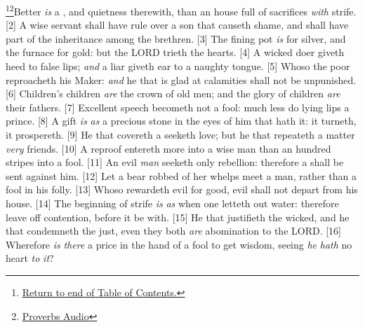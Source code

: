 \footnote{\textcolor[cmyk]{0.99998,1,0,0}{\hyperlink{TOC}{Return to end of Table of Contents.}}}\footnote{\href{https://www.audioverse.org/english/audiobibles/books/ENGKJV/O/Prov/1}{\textcolor[cmyk]{0.99998,1,0,0}{Proverbs Audio}}}\textcolor[cmyk]{0.99998,1,0,0}{Better \emph{is} a , and quietness therewith, than an house full of sacrifices \emph{with} strife.}
[2] \textcolor[cmyk]{0.99998,1,0,0}{A wise servant shall have rule over a son that causeth shame, and shall have part of the inheritance among the brethren.}
[3] \textcolor[cmyk]{0.99998,1,0,0}{The fining pot \emph{is} for silver, and the furnace for gold: but the LORD trieth the hearts.}
[4] \textcolor[cmyk]{0.99998,1,0,0}{A wicked doer giveth heed to false lips; \emph{and} a liar giveth ear to a naughty tongue.}
[5] \textcolor[cmyk]{0.99998,1,0,0}{Whoso  the poor reproacheth his Maker: \emph{and} he that is glad at calamities shall not be unpunished.}
[6] \textcolor[cmyk]{0.99998,1,0,0}{Children's children \emph{are} the crown of old men; and the glory of children \emph{are} their fathers.}
[7] \textcolor[cmyk]{0.99998,1,0,0}{Excellent speech becometh not a fool: much less do lying lips a prince.}
[8] \textcolor[cmyk]{0.99998,1,0,0}{A gift \emph{is} \emph{as} a precious stone in the eyes of him that hath it:  it turneth, it prospereth.}
[9] \textcolor[cmyk]{0.99998,1,0,0}{He that covereth a  seeketh love; but he that repeateth a matter  \emph{very} friends.}
[10] \textcolor[cmyk]{0.99998,1,0,0}{A reproof entereth more into a wise man than an hundred stripes into a fool.}
[11] \textcolor[cmyk]{0.99998,1,0,0}{An evil \emph{man} seeketh only rebellion: therefore a  shall be sent against him.}
[12] \textcolor[cmyk]{0.99998,1,0,0}{Let a bear robbed of her whelps meet a man, rather than a fool in his folly.}
[13] \textcolor[cmyk]{0.99998,1,0,0}{Whoso rewardeth evil for good, evil shall not depart from his house.}
[14] \textcolor[cmyk]{0.99998,1,0,0}{The beginning of strife \emph{is} \emph{as} when one letteth out water: therefore leave off contention, before it be  with.}
[15] \textcolor[cmyk]{0.99998,1,0,0}{He that justifieth the wicked, and he that condemneth the just, even they both \emph{are} abomination to the LORD.}
[16] \textcolor[cmyk]{0.99998,1,0,0}{Wherefore \emph{is} \emph{there} a price in the hand of a fool to get wisdom, seeing \emph{he} \emph{hath} no heart \emph{to} \emph{it}?}
